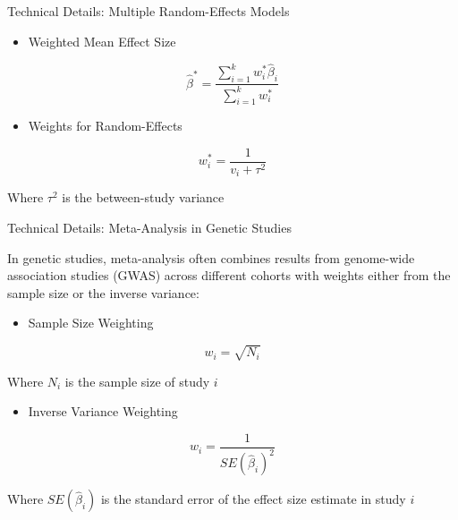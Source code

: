 \begin{frame}{Technical Details: Multiple Random-Effects Models}

\begin{itemize}
\item Weighted Mean Effect Size
\end{itemize}
$$\hat{\beta}^* = \frac{\sum_{i=1}^{k} w_i^* \hat{\beta}_i}{\sum_{i=1}^{k} w_i^*}$$

\begin{itemize}
\item Weights for Random-Effects
\end{itemize}
    $$w_i^* = \frac{1}{v_i + \tau^2}$$

    Where $\tau^2$ is the between-study variance

\end{frame}

\begin{frame}{Technical Details: Meta-Analysis in Genetic Studies}

In genetic studies, meta-analysis often combines results from genome-wide association studies (GWAS) across different cohorts with weights either from the sample size or the inverse variance:

\begin{itemize}
\item Sample Size Weighting
\end{itemize}
    $$w_i = \sqrt{N_i}$$

    Where $N_i$ is the sample size of study $i$

\begin{itemize}
\item Inverse Variance Weighting
\end{itemize}
    $$w_i = \frac{1}{SE(\hat{\beta}_i)^2}$$

    Where $SE(\hat{\beta}_i)$ is the standard error of the effect size estimate in study $i$
\end{frame}

